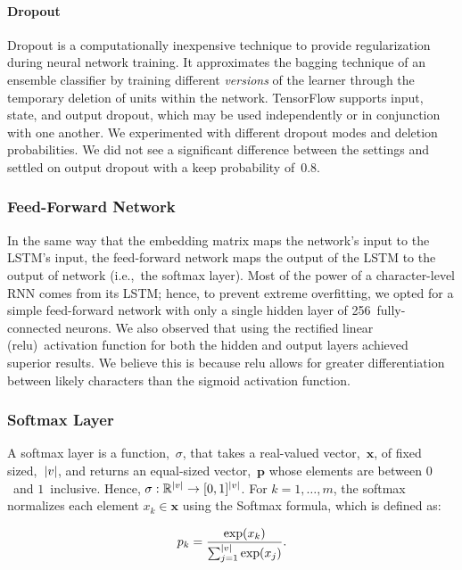 \documentclass{article}
\DeclarePairedDelimiter\abs{\lvert}{\rvert}%
\begin{document}
\paragraph{Dropout}\label{sec:dropout}

Dropout is a computationally inexpensive technique to provide regularization during neural network training.  It approximates the bagging technique of an ensemble classifier by training different \textit{versions} of the learner through the temporary deletion of units within the network.\cite{goodfellow2016}  TensorFlow supports input, state, and output dropout, which may be used independently or in conjunction with one another.  We experimented with different dropout modes and deletion probabilities.  We did not see a significant difference between the settings and settled on output dropout with a keep probability of~0.8.

\subsubsection{Feed-Forward Network}

In the same way that the embedding matrix maps the network's input to the LSTM's input, the feed-forward network maps the output of the LSTM to the output of network (i.e.,~the softmax layer).  Most of the power of a character-level RNN comes from its LSTM; hence, to prevent extreme overfitting, we opted for a simple feed-forward network with only a single hidden layer of 256~fully-connected neurons.   We also observed that using the rectified linear (relu)~activation function for both the hidden and output layers achieved superior results.  We believe this is because relu allows for greater differentiation between likely characters than the sigmoid activation function.


\subsubsection{Softmax Layer}

A softmax layer is a function,~$\sigma$, that takes a real-valued vector,~$\mathbf{x}$, of fixed sized,~$\abs*{v}$, and returns an equal-sized vector,~$\mathbf{p}$ whose elements are between $0$~and $1$~inclusive.  Hence, $\sigma : \mathbb{R}^{\abs*{v}} \rightarrow [0,1]^{\abs*{v}}$. For $k=1,\ldots,m$, the softmax normalizes each element $x_k \in \mathbf{x}$ using the Softmax formula, which is defined as:

\begin{equation}
  p_k = \frac{\exp(x_k)}{\sum_{j=1}^{\abs*{v}} \exp(x_j)}\textrm{.}
\end{equation}
\end{document}
